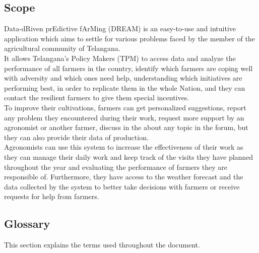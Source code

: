 \subsection{Scope}
Data-dRiven prEdictive fArMing (DREAM) is an easy-to-use and intuitive application which aims to settle for various problems faced by the member of the agricultural community of Telangana.\\
It allows Telangana's Policy Makers (TPM) to access data and analyze the performance of all farmers in the country, identify which farmers are coping well with adversity and which ones need help, understanding which initiatives are performing best, in order to replicate them in the whole Nation, and they can contact the resilient farmers to give them special incentives.\\
To improve their cultivations, farmers can get personalized suggestions, report any problem they encountered during their work, request more support by an agronomist or another farmer, discuss in the about any topic in the forum, but they can also provide their data of production.\\
Agronomists can use this system to increase the effectiveness of their work as they can manage their daily work and keep track of the visits they have planned throughout the year and evaluating the performance of farmers they are responsible of. Furthermore, they have access to the weather forecast and the data collected by the system to better take decisions with farmers or receive requests for help from farmers.
\newpage
\subsection{Glossary}
This section explains the terms used throughout the document.
